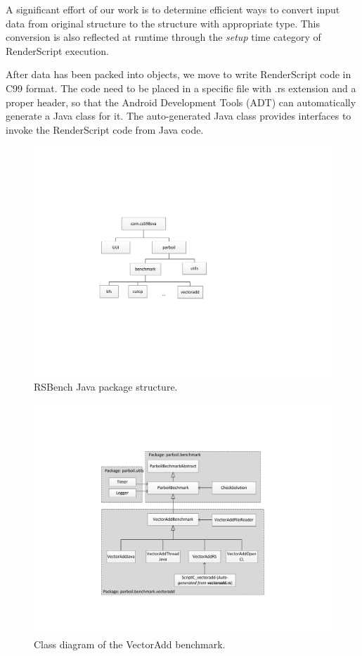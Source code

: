 A significant effort of our work is to determine efficient ways to convert input
data from original structure to the  structure with appropriate
 type. This conversion is also reflected at runtime through the
\textit{setup} time category of RenderScript execution.

After data has been packed into  objects, we move to write
RenderScript code in C99 format. The code need to be placed in a specific file
with .rs extension and a proper header, so that the Android Development Tools
(ADT) can automatically generate a Java class for it. The auto-generated Java
class provides interfaces to invoke the RenderScript code from Java code.

\begin{figure}[t!]
\centering
\includegraphics[scale=0.65]{figs/package_diagram.pdf}
\caption{RSBench Java package structure.}
\label{fig:package_structure}
\centering
\end{figure}


\begin{figure}[t!]
\centering
\includegraphics[scale=0.5]{figs/vectoradd_class_diagram.pdf}
\caption{Class diagram of the VectorAdd benchmark.}
\label{fig:class_diagram}
\centering
\end{figure}



